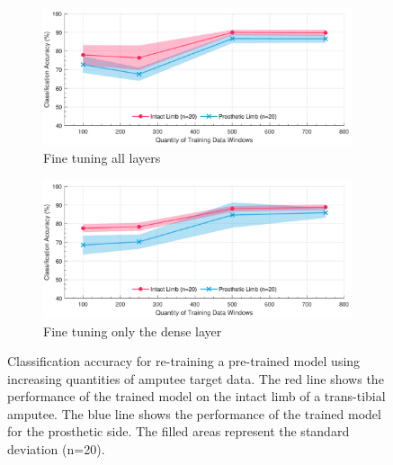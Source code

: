 \begin{figure}[!hbtp]
    \centering
    \begin{subfigure}{\textwidth}
        \centering
        \includegraphics[width=\textwidth]{content/6-Amputee/ch6_pre_trained_model_accuracy.pdf}
        \caption{Fine tuning all layers}
    \end{subfigure}
    \begin{subfigure}{\textwidth}
        \centering
        \includegraphics[width=\textwidth]{content/6-Amputee/ch6_frozen_lstm_layer_accuracy.pdf}
        \caption{Fine tuning only the dense layer}
    \end{subfigure}
    \caption[Classification accuracy for re-training a pre-trained model using increasing quantities of amputee target data]{Classification accuracy for re-training a pre-trained model using increasing quantities of amputee target data. The red line shows the performance of the trained model on the intact limb of a trans-tibial amputee. The blue line shows the performance of the trained model for the prosthetic side. The filled areas represent the standard deviation (n=20).}
    \label{fig:ch6-amputee-retrain-pre-trained}
\end{figure}
